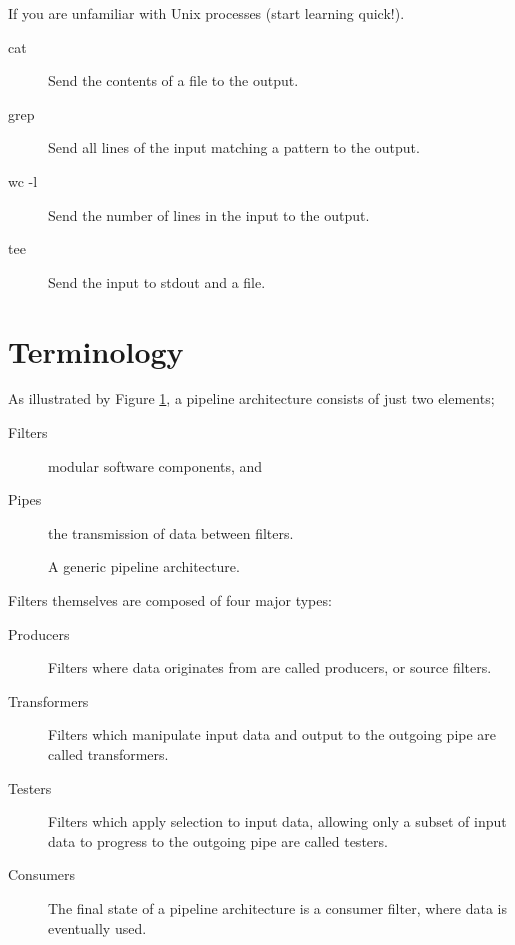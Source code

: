 \noindent
If you are unfamiliar with Unix processes (start learning quick!).
\begin{description}
    \item[cat] Send the contents of a file to the output.
    \item[grep] Send all lines of the input matching a pattern to the output.
    \item[wc -l] Send the number of lines in the input to the output.
    \item[tee] Send the input to stdout and a file.
\end{description}

\section{Terminology}

As illustrated by Figure \ref{fig:pipe-filter}, a pipeline architecture consists of just two elements;

\begin{description}
    \item[Filters] modular software components, and
    \item[Pipes] the transmission of data between filters.   
\end{description}

\begin{figure}[ht]
    \centering
{}
\caption{A generic pipeline architecture.}
\label{fig:pipe-filter}
\end{figure}

\noindent Filters themselves are composed of four major types:

\begin{description}
    \item[Producers] Filters where data originates from are called producers, or source filters.
    \item[Transformers] Filters which manipulate input data and output to the outgoing pipe are called transformers.
    \item[Testers] Filters which apply selection to input data, allowing only a subset of input data to progress to the outgoing pipe are called testers.
    \item[Consumers] The final state of a pipeline architecture is a consumer filter, where data is eventually used.
\end{description}

